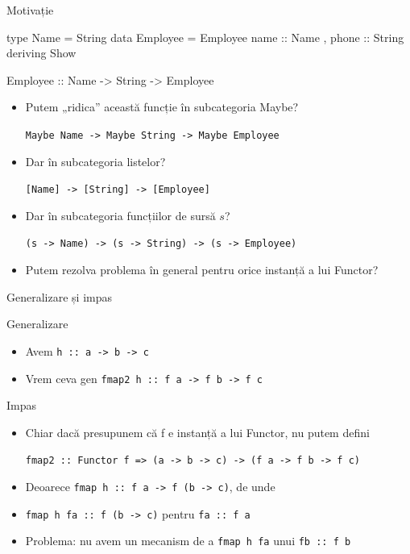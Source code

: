 \documentclass[xcolor=pdftex,romanian,colorlinks]{beamer}
\begin{document}
\begin{frame}[fragile]{Motivație}
\begin{asciihs}
type Name = String
data Employee = Employee { name    :: Name
                         , phone   :: String }
                deriving Show
\end{asciihs}                

\begin{asciihs}
Employee :: Name -> String -> Employee
\end{asciihs}

\begin{itemize}
\item Putem „ridica” această funcție în subcategoria Maybe?

\lstinline$Maybe Name -> Maybe String -> Maybe Employee$

\item Dar în subcategoria listelor?

\lstinline$[Name] -> [String] -> [Employee]$

\item Dar în subcategoria funcțiilor de sursă $s$?

\lstinline$(s -> Name) -> (s -> String) -> (s -> Employee)$

\item Putem rezolva problema în general pentru orice instanță a lui Functor?
\end{itemize}
\end{frame}

\begin{frame}[fragile]{Generalizare și impas}
\begin{block}{Generalizare}
\begin{itemize}
\item Avem \lstinline$h :: a -> b -> c$
\item Vrem ceva gen \lstinline$fmap2 h :: f a -> f b -> f c$
\end{itemize}
\end{block}

\begin{block}{Impas}
\begin{itemize}
\item Chiar dacă presupunem că f e instanță a lui Functor, nu putem defini 

\lstinline$fmap2 :: Functor f => (a -> b -> c) -> (f a -> f b -> f c)$
\item Deoarece \lstinline$fmap h :: f a -> f (b -> c)$, de unde
\item \lstinline$fmap h fa :: f (b -> c)$ pentru \lstinline$fa :: f a$
\item \alert{Problema:} nu avem un mecanism de a  \lstinline$fmap h fa$ unui  \lstinline$fb :: f b$
\end{itemize}
\end{block}
\end{frame}
\end{document}

